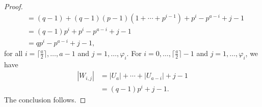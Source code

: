 \documentclass[12pt,amscd]{amsart}
\theoremstyle{definition}
\numberwithin{equation}{section}
\begin{document}
\begin{proof}
\begin{align*}
                   & = (q-1) + (q-1)(p-1) ( 1 + \cdots + p^{i-1}) + p^i - p^{a-i} + j - 1 \\
                   & = (q-1)p^i + p^i - p^{a-i}  + j -1\\
                   & = qp^i - p^{a-i} + j -1,
    \end{align*}
    for all $i = \lceil \frac{a}{2} \rceil, \ldots, a-1$ and $j = 1, \ldots, \varphi_i$. For $i = 0, \ldots, \lceil \frac{a}{2} \rceil - 1$ and $j = 1, \ldots, \varphi_i$, we have 
    \begin{align*}
        |W_{i,j}| & = |U_{a}| + \cdots + |U_{a-i}| + j-1\\
                   & = (q-1)p^i + j -1.
    \end{align*}
    The conclusion follows.
\end{proof}
\end{document}
